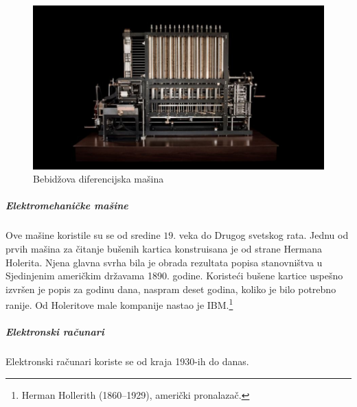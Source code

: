 \documentclass[a4paper]{article}
\begin{document}
\begin{figure}[h!]
\begin{center}
\includegraphics[scale=0.25]{pictures/bebidz.jpg}
\end{center}
\caption{Bebidžova diferencijska mašina}
\label{fig:beb}
\end{figure}

\subparagraph{Elektromehaničke mašine}
Ove mašine koristile su se od sredine $19.$ veka do Drugog svetskog rata.
Jednu od prvih mašina za čitanje bušenih kartica konstruisana je od strane Hermana Holerita. Njena glavna svrha bila je obrada rezultata popisa stanovništva u Sjedinjenim američkim državama 1890. godine. 
Koristeći bušene kartice uspešno izvršen je popis za godinu dana, naspram deset godina, koliko je bilo potrebno ranije. Od Holeritove male kompanije nastao je IBM.\footnote{Herman Hollerith (1860–1929), američki pronalazač.}

\subparagraph{Elektronski računari} Elektronski računari koriste se od kraja 1930-ih do
danas. 
 
\end{document}
